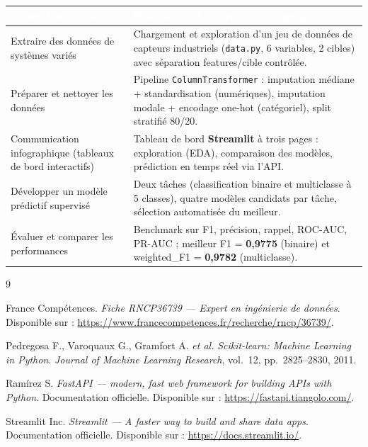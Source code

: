 \documentclass[11pt]{article}
\newcommand{\thead}[1]{\textbf{\textcolor{white}{#1}}}
\begin{document}
\begin{center}
\begin{tabularx}{\linewidth}{|>{\raggedright\arraybackslash}p{4.2cm}|>{\raggedright\arraybackslash}X|}
\hline
\rowcolor{tableHeader}
\thead{Compétence visée} & \thead{Réalisation et preuve dans le projet} \\
\hline
Extraire des données de systèmes variés &
  Chargement et exploration d'un jeu de données de capteurs industriels
  (\texttt{data.py}, 6 variables, 2 cibles) avec séparation features/cible contrôlée. \\
\hline
Préparer et nettoyer les données &
  Pipeline \texttt{ColumnTransformer} : imputation médiane + standardisation
  (numériques), imputation modale + encodage one-hot (catégoriel), split
  stratifié 80/20. \\
\hline
Communication infographique (tableaux de bord interactifs) &
  Tableau de bord \textbf{Streamlit} à trois pages : exploration (EDA),
  comparaison des modèles, prédiction en temps réel via l'API. \\
\hline
Développer un modèle prédictif supervisé &
  Deux tâches (classification binaire et multiclasse à 5 classes), quatre
  modèles candidats par tâche, sélection automatisée du meilleur. \\
\hline
Évaluer et comparer les performances &
  Benchmark sur F1, précision, rappel, ROC-AUC, PR-AUC ; meilleur F1
  = \textbf{0,9775} (binaire) et weighted\_F1 = \textbf{0,9782} (multiclasse). \\
\hline
\end{tabularx}
\end{center}

\begin{thebibliography}{9}

France Compétences.
\textit{Fiche RNCP36739 --- Expert en ingénierie de données}.
Disponible sur : \url{https://www.francecompetences.fr/recherche/rncp/36739/}.

Pedregosa F., Varoquaux G., Gramfort A. \textit{et al.}
\textit{Scikit-learn: Machine Learning in Python}.
\textit{Journal of Machine Learning Research}, vol.~12, pp.~2825--2830, 2011.

Ramírez S.
\textit{FastAPI --- modern, fast web framework for building APIs with Python}.
Documentation officielle. Disponible sur : \url{https://fastapi.tiangolo.com/}.

Streamlit Inc.
\textit{Streamlit --- A faster way to build and share data apps}.
Documentation officielle. Disponible sur : \url{https://docs.streamlit.io/}.

\end{thebibliography}
\end{document}
